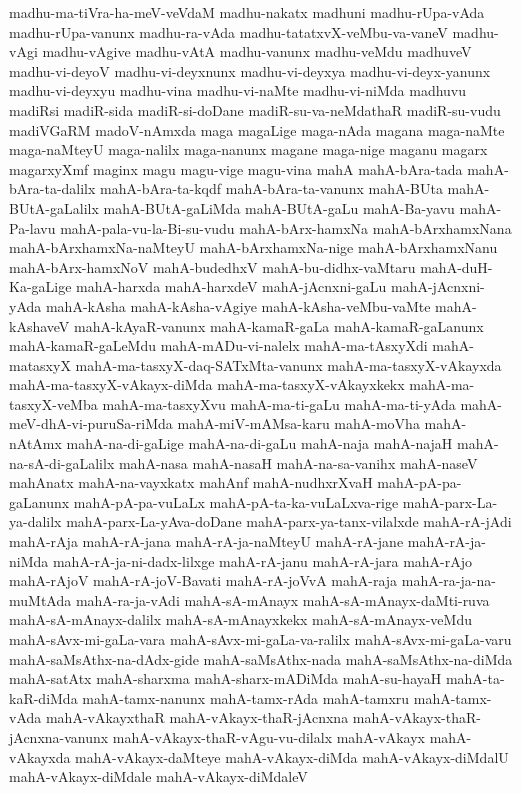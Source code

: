 {madhu-ma-tiVra-ha-meV-veVdaM
madhu-nakatx
madhuni
madhu-rUpa-vAda
madhu-rUpa-vanunx
madhu-ra-vAda
madhu-tatatxvX-veMbu-va-vaneV
madhu-vAgi
madhu-vAgive
madhu-vAtA
madhu-vanunx
madhu-veMdu
madhuveV
madhu-vi-deyoV
madhu-vi-deyxnunx
madhu-vi-deyxya
madhu-vi-deyx-yanunx
madhu-vi-deyxyu
madhu-vina
madhu-vi-naMte
madhu-vi-niMda
madhuvu
madiRsi
madiR-sida
madiR-si-doDane
madiR-su-va-neMdathaR
madiR-su-vudu
madiVGaRM
madoV-nAmxda
maga
magaLige
maga-nAda
magana
maga-naMte
maga-naMteyU
maga-nalilx
maga-nanunx
magane
maga-nige
maganu
magarx
magarxyXmf
maginx
magu
magu-vige
magu-vina
mahA
mahA-bAra-tada
mahA-bAra-ta-dalilx
mahA-bAra-ta-kqdf
mahA-bAra-ta-vanunx
mahA-BUta
mahA-BUtA-gaLalilx
mahA-BUtA-gaLiMda
mahA-BUtA-gaLu
mahA-Ba-yavu
mahA-Pa-lavu
mahA-pala-vu-la-Bi-su-vudu
mahA-bArx-hamxNa
mahA-bArxhamxNana
mahA-bArxhamxNa-naMteyU
mahA-bArxhamxNa-nige
mahA-bArxhamxNanu
mahA-bArx-hamxNoV
mahA-budedhxV
mahA-bu-didhx-vaMtaru
mahA-duH-Ka-gaLige
mahA-harxda
mahA-harxdeV
mahA-jAcnxni-gaLu
mahA-jAcnxni-yAda
mahA-kAsha
mahA-kAsha-vAgiye
mahA-kAsha-veMbu-vaMte
mahA-kAshaveV
mahA-kAyaR-vanunx
mahA-kamaR-gaLa
mahA-kamaR-gaLanunx
mahA-kamaR-gaLeMdu
mahA-mADu-vi-nalelx
mahA-ma-tAsxyXdi
mahA-matasxyX
mahA-ma-tasxyX-daq-SATxMta-vanunx
mahA-ma-tasxyX-vAkayxda
mahA-ma-tasxyX-vAkayx-diMda
mahA-ma-tasxyX-vAkayxkekx
mahA-ma-tasxyX-veMba
mahA-ma-tasxyXvu
mahA-ma-ti-gaLu
mahA-ma-ti-yAda
mahA-meV-dhA-vi-puruSa-riMda
mahA-miV-mAMsa-karu
mahA-moVha
mahA-nAtAmx
mahA-na-di-gaLige
mahA-na-di-gaLu
mahA-naja
mahA-najaH
mahA-na-sA-di-gaLalilx
mahA-nasa
mahA-nasaH
mahA-na-sa-vanihx
mahA-naseV
mahAnatx
mahA-na-vayxkatx
mahAnf
mahA-nudhxrXvaH
mahA-pA-pa-gaLanunx
mahA-pA-pa-vuLaLx
mahA-pA-ta-ka-vuLaLxva-rige
mahA-parx-La-ya-dalilx
mahA-parx-La-yAva-doDane
mahA-parx-ya-tanx-vilalxde
mahA-rA-jAdi
mahA-rAja
mahA-rA-jana
mahA-rA-ja-naMteyU
mahA-rA-jane
mahA-rA-ja-niMda
mahA-rA-ja-ni-dadx-lilxge
mahA-rA-janu
mahA-rA-jara
mahA-rAjo
mahA-rAjoV
mahA-rA-joV-Bavati
mahA-rA-joVvA
mahA-raja
mahA-ra-ja-na-muMtAda
mahA-ra-ja-vAdi
mahA-sA-mAnayx
mahA-sA-mAnayx-daMti-ruva
mahA-sA-mAnayx-dalilx
mahA-sA-mAnayxkekx
mahA-sA-mAnayx-veMdu
mahA-sAvx-mi-gaLa-vara
mahA-sAvx-mi-gaLa-va-ralilx
mahA-sAvx-mi-gaLa-varu
mahA-saMsAthx-na-dAdx-gide
mahA-saMsAthx-nada
mahA-saMsAthx-na-diMda
mahA-satAtx
mahA-sharxma
mahA-sharx-mADiMda
mahA-su-hayaH
mahA-ta-kaR-diMda
mahA-tamx-nanunx
mahA-tamx-rAda
mahA-tamxru
mahA-tamx-vAda
mahA-vAkayxthaR
mahA-vAkayx-thaR-jAcnxna
mahA-vAkayx-thaR-jAcnxna-vanunx
mahA-vAkayx-thaR-vAgu-vu-dilalx
mahA-vAkayx
mahA-vAkayxda
mahA-vAkayx-daMteye
mahA-vAkayx-diMda
mahA-vAkayx-diMdalU
mahA-vAkayx-diMdale
mahA-vAkayx-diMdaleV
}
